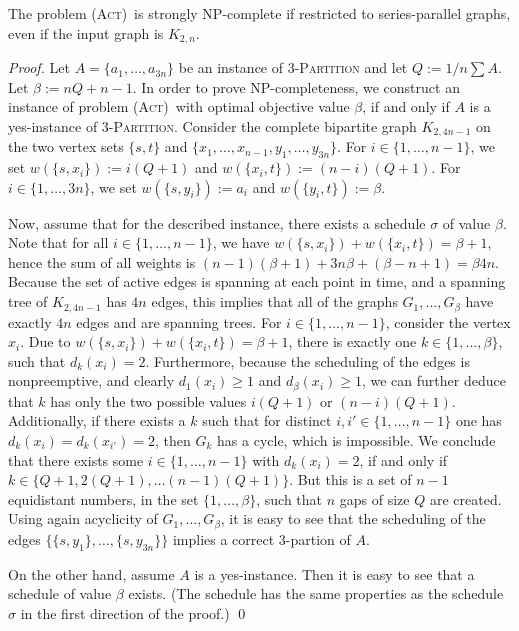\documentclass[runningheads]{llncs}
\numberwithin{equation}{section}
\newcommand{\set}[1]{\{ #1 \}}
\newcommand{\fromto}[2]{\set{#1, \ldots, #2}}
\newcommand{\act}{\textsc{(Act)}}
\begin{document}
\begin{theorem}
\label{thm:hardness_complete_bipartite}
The problem \act\ is strongly NP-complete if restricted to series-parallel graphs, even if the input graph is $K_{2,n}$.
\end{theorem}
\begin{proof}
Let $A = \fromto{a_1}{a_{3n}}$ be an instance of \textsc{3-Partition} and let $Q := 1/n \sum A$. Let $\beta := nQ + n - 1$. In order to prove NP-completeness, we construct an instance of problem \act\ with optimal objective value $\beta$, if and only if $A$ is a yes-instance of \textsc{3-Partition}. Consider the  complete bipartite graph $K_{2,4n-1}$ on the two vertex sets $\set{s, t}$ and $\set{x_1, \ldots, x_{n-1}, y_1, \ldots, y_{3n}}$. For $i \in \{1, \dots,n-1\}$, we set $w(\set{s,x_i}) := i(Q + 1)$ and $w(\set{x_i,t}) := (n - i)(Q + 1)$. For $i \in \{1,\dots,3n\}$, we set $w(\set{s,y_i}) := a_i$ and $w(\set{y_i,t}) := \beta$. 

Now, assume that for the described instance, there exists a schedule $\sigma$ of value $\beta$. Note that for all $i \in \{1,\dots,n-1\}$, we have $w(\set{s,x_i}) + w(\set{x_i,t}) = \beta + 1$, hence the sum of all weights is $(n-1)(\beta + 1) + 3n\beta + (\beta - n + 1) = \beta 4n$. Because the set of active edges is spanning at each point in time, and a spanning tree of $K_{2, 4n-1}$ has $4n$ edges, this implies that all of the graphs $G_1, \dots, G_\beta$ have exactly $4n$ edges and are spanning trees. 
For $i \in \{1,\dots,n-1\}$, consider the vertex $x_i$. Due to $w(\set{s,x_i}) + w(\set{x_i,t}) = \beta + 1$, there is exactly one $k \in \fromto{1}{\beta}$, such that $d_k(x_i) = 2$. Furthermore, because the scheduling of the edges is nonpreemptive, and clearly $d_1(x_i) \geq 1$ and $d_\beta(x_i) \geq 1$, we can further deduce that $k$ has only the two possible values $i(Q+1)$ or $(n-i)(Q+1)$. Additionally, if there exists a $k$ such that for distinct $i, i' \in \{1,\dots,n-1\}$ one has $d_k(x_i) = d_k(x_{i'}) = 2$, then $G_k$ has a cycle, which is impossible. We conclude that there exists some $i \in \{1,\dots,n-1\}$ with $d_k(x_i) = 2$, if and only if $k \in \set{Q+1, 2(Q+1), \dots (n-1)(Q+1)}$. But this is a set of $n-1$ equidistant numbers, in the set $\fromto{1}{\beta}$, such that $n$ gaps of size $Q$ are created. Using again acyclicity of $G_1, \dots, G_\beta$, it is easy to see that the scheduling of the edges $\fromto{\set{s,y_1}}{\set{s,y_{3n}}}$ implies a correct 3-partion of $A$.

On the other hand, assume $A$ is a yes-instance. Then it is easy to see that a schedule of value $\beta$ exists. (The schedule has the same properties as the schedule $\sigma$ in the first direction of the proof.)
\qed
\end{proof}
\end{document}
